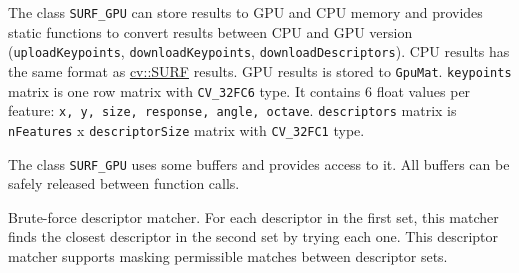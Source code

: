The class \texttt{SURF\_GPU} can store results to GPU and CPU memory and provides static functions to convert results between CPU and GPU version (\texttt{uploadKeypoints}, \texttt{downloadKeypoints}, \texttt{downloadDescriptors}). CPU results has the same format as \hyperref[cv.class.SURF]{cv::SURF} results. GPU results is stored to \texttt{GpuMat}. \texttt{keypoints} matrix is one row matrix with \texttt{CV\_32FC6} type. It contains 6 float values per feature: \texttt{x, y, size, response, angle, octave}. \texttt{descriptors} matrix is \texttt{nFeatures} x \texttt{descriptorSize} matrix with \texttt{CV\_32FC1} type.

The class \texttt{SURF\_GPU} uses some buffers and provides access to it. All buffers can be safely released between function calls. 

Brute-force descriptor matcher. For each descriptor in the first set, this matcher finds the closest descriptor in the second set by trying each one. This descriptor matcher supports masking permissible matches between descriptor sets.

